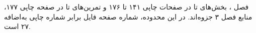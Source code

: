 فصل ، بخش‌های  تا  در
صفحات چاپی ۱۴۱ تا ۱۷۶ و تمرین‌های  تا
 در صفحه چاپی ۱۷۷، منابع فصل ۳ جزوه‌اند.
در این محدوده، شماره صفحه فایل  برابر شماره چاپی
به‌اضافه ۲۷ است.
